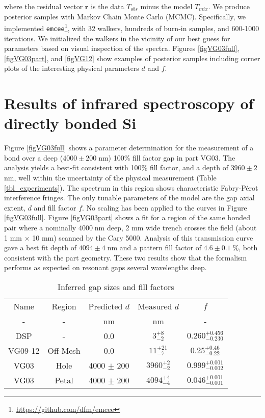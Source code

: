 \documentclass[osajnl,twocolumn,showpacs,superscriptaddress,11pt]{revtex4-1} %
\begin{document}
where the residual vector $\boldsymbol{r}$ is the data $T_{obs}$ minus the model $T_{mix}$.  We produce posterior samples with Markov Chain Monte Carlo (MCMC).  Specifically, we implemented \texttt{emcee}\footnote{\url{https://github.com/dfm/emcee}}\cite{emcee}, with 32 walkers, hundreds of burn-in samples, and 600-1000 iterations.  We initialized the walkers in the vicinity of our best guess for parameters based on visual inspection of the spectra.  Figures \ref{figVG03full}, \ref{figVG03part}, and \ref{figVG12} show examples of posterior samples including corner plots of the interesting physical parameters $d$ and $f$.

\section{Results of infrared spectroscopy of directly bonded Si}
\label{secResults}

Figure \ref{figVG03full} shows a parameter determination for the measurement of a bond over a deep ($4000 \pm 200\;$nm) 100\% fill factor gap in part VG03.  The analysis yields a best-fit consistent with 100\% fill factor, and a depth of $3960 \pm 2\;$nm, well within the uncertainty of the physical measurement (Table \ref{tbl_experiments}).  The spectrum in this region shows characteristic Fabry-P\'{e}rot interference fringes.  The only tunable parameters of the model are the gap axial extent, $d$ and fill factor $f$.  No scaling has been applied to the curves in Figure \ref{figVG03full}.  Figure \ref{figVG03part} shows a fit for a region of the same bonded pair where a nominally $4000\;$nm deep, 2 mm wide trench crosses the field (about 1 mm $\times$ 10 mm) scanned by the Cary 5000.  Analysis of this transmission curve gave a best fit depth of $4094 \pm 4\;$nm and a pattern fill factor of $4.6 \pm 0.1\;\%$, both consistent with the part geometry.  These two results show that the formalism performs as expected on resonant gaps several wavelengths deep.

\begin{table*}[!htbp]
\caption{Inferred gap sizes and fill factors \label{tbl_DerivedGapSizes}}
\begin{center}
    \begin{tabular}{ c c c c c }
    \hline
    Name & Region & Predicted $d$ & Measured $d$ & $f$ \\
    -  & - & nm & nm & - \\
    \hline
    DSP & -    &   0.0  & $3^{+8}_{-2}$ & $0.260^{+0.456}_{-0.230}$\\
    VG09-12 & Off-Mesh    &   0.0  & $11^{+21}_{-7}$ & $0.25^{+0.46}_{-0.22}$\\
    VG03 & Hole    &   4000 $\pm$ 200  & $3960^{+2}_{-2}$ &  $0.999^{+0.001}_{-0.002}$\\
    VG03 & Petal   &   4000 $\pm$ 200  & $4094^{+4}_{-4}$ &  $0.046^{+0.001}_{-0.001}$\\
    \hline
    \end{tabular}
\end{center}
\end{table*}
\end{document}
